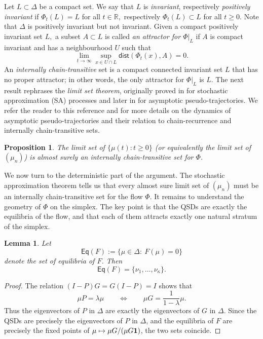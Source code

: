 \documentclass[10pt,letterpaper]{article}
\theoremstyle{compactplain}
\newtheorem{lemma}[theorem]{Lemma}
\newtheorem{proposition}[theorem]{Proposition}
\theoremstyle{compactdefinition}
\newcommand{\RR}{\mathbb R}
\newcommand{\rar}{\rightarrow}
\newcommand{\1}{\mathds{1}}
\begin{document}
Let $L \subset \Delta$ be a compact set. We say that $L$ is {\em invariant}, respectively {\em positively invariant} if   $\Phi_t(L) =  L$ for all $t \in \RR,$ respectively $\Phi_t(L) \subset L$ for all $t \geq 0.$  Note that $\Delta$ is  positively invariant  but not invariant. Given  a compact positively invariant set $L,$ a subset $A \subset L$ is called {\em an attractor for $\Phi|_L$} if $A$ is compact invariant and has a neighbourhood $U$ such that
$$\lim_{t \rar \infty} \sup_{x \in U \cap L } \mathsf{dist}(\Phi_t(x),A) = 0.$$ 
An {\em internally chain-transitive} set is a compact connected invariant set $L$ that  has no proper attractor; in other words, the only attractor for $\Phi|_L$ is $L.$
The next result rephrases the {\em limit set theorem}, originally proved in \cite{Ben96} for stochastic approximation (SA) processes and later in \cite{BH96} for asymptotic pseudo-trajectories. We refer the reader to this reference and \cite{B99} for more details on the dynamics of asymptotic pseudo-trajectories and their relation to chain-recurrence and internally chain-transitive sets.


\begin{proposition}
\label{prop:limitset}
The limit set of $\{\mu(t):t\geq 0\}$ (or equivalently the limit set of $(\mu_n)$) is almost surely an internally chain-transitive set for $\Phi$.
\end{proposition}

We now turn to the deterministic part of the argument. The stochastic approximation theorem tells us that every almost sure limit set of $(\mu_n)$ must be an internally chain-transitive set for the flow $\Phi$. It remains to understand the geometry of $\Phi$ on the simplex. The key point is that the QSDs are exactly the equilibria of the flow, and that each of them attracts exactly one natural stratum of the simplex.

\begin{lemma}
Let
\[
\mathsf{Eq}(F)
:=
\{\mu\in\Delta:\ F(\mu)=0\}
\]
denote the set of equilibria of \(F\). Then
\[
\mathsf{Eq}(F)
=
\{\nu_1,\ldots,\nu_\kappa\}.
\]
\end{lemma}

\begin{proof}
The relation $(I-P)G=G(I-P)=I$ shows that
\[
\mu P=\lambda\mu
\qquad\Longleftrightarrow\qquad
\mu G=\frac{1}{1-\lambda}\mu.
\]
Thus the eigenvectors of $P$ in $\Delta$ are exactly the eigenvectors of $G$ in $\Delta$. Since the QSDs are precisely the eigenvectors of $P$ in $\Delta$, and the equilibria of $F$ are precisely the fixed points of $\mu\mapsto \mu G/(\mu G{\bf 1})$, the two sets coincide.
\end{proof}
\end{document}
